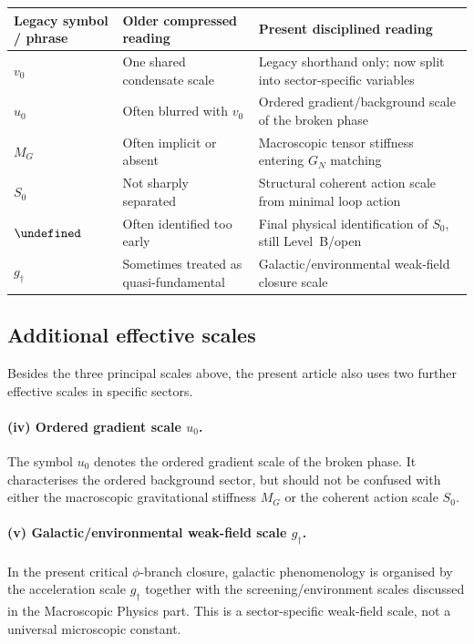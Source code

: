 \documentclass[11pt,a4paper]{article}
\let\hbar\undefined
\numberwithin{equation}{section}
\begin{document}
\begin{center}
\renewcommand{\arraystretch}{1.25}
\begin{tabular}{p{3.0cm}p{4.8cm}p{4.5cm}}
\hline\hline
Legacy symbol / phrase & Older compressed reading & Present disciplined reading \\
\hline
$v_0$ & One shared condensate scale & Legacy shorthand only; now split into sector-specific variables \\
$u_0$ & Often blurred with $v_0$ & Ordered gradient/background scale of the broken phase \\
$M_G$ & Often implicit or absent & Macroscopic tensor stiffness entering $G_N$ matching \\
$S_0$ & Not sharply separated & Structural coherent action scale from minimal loop action \\
$\hbar$ & Often identified too early & Final physical identification of $S_0$, still Level~B/open \\
$g_\dagger$ & Sometimes treated as quasi-fundamental & Galactic/environmental weak-field closure scale \\
\hline\hline
\end{tabular}
\end{center}

\subsection*{Additional effective scales}

Besides the three principal scales above, the present article also uses
two further effective scales in specific sectors.

\paragraph{(iv) Ordered gradient scale $u_0$.}
The symbol $u_0$ denotes the ordered gradient scale of the broken phase.
It characterises the ordered background sector, but should not be
confused with either the macroscopic gravitational stiffness $M_G$ or
the coherent action scale $S_0$.

\paragraph{(v) Galactic/environmental weak-field scale $g_\dagger$.}
In the present critical $\phi$-branch closure, galactic phenomenology is
organised by the acceleration scale $g_\dagger$ together with the
screening/environment scales discussed in the Macroscopic Physics part.
This is a sector-specific weak-field scale, not a universal microscopic
constant.
\end{document}
